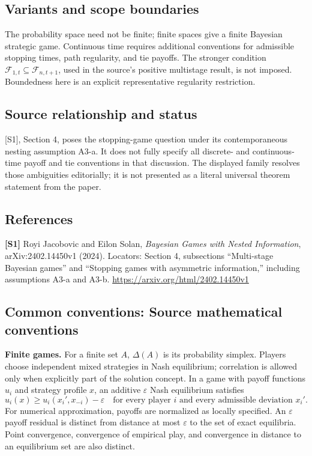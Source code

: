 \documentclass[11pt,a4paper]{article}
\begin{document}
\subsection*{Variants and scope boundaries}
The probability space need not be finite; finite spaces give a finite Bayesian strategic game. Continuous time requires additional conventions for admissible stopping times, path regularity, and tie payoffs. The stronger condition $\mathcal F_{1,t}\subseteq\mathcal F_{n,t+1}$, used in the source's positive multistage result, is not imposed. Boundedness here is an explicit representative regularity restriction.
\subsection*{Source relationship and status}
[S1], Section 4, poses the stopping-game question under its contemporaneous nesting assumption A3-a. It does not fully specify all discrete- and continuous-time payoff and tie conventions in that discussion. The displayed family resolves those ambiguities editorially; it is not presented as a literal universal theorem statement from the paper.
\subsection*{References}
\begingroup\footnotesize\raggedright
\textbf{[S1]} Royi Jacobovic and Eilon Solan, \emph{Bayesian Games with Nested Information}, arXiv:2402.14450v1 (2024). Locators: Section 4, subsections ``Multi-stage Bayesian games'' and ``Stopping games with asymmetric information,'' including assumptions A3-a and A3-b. \url{https://arxiv.org/html/2402.14450v1}
\par\endgroup

\subsection*{Common conventions: Source mathematical conventions}

\textbf{Finite games.} For a finite set $A$, $\Delta(A)$ is its probability
simplex. Players choose independent mixed strategies in Nash equilibrium;
correlation is allowed only when explicitly part of the solution concept.
In a game with payoff functions $u_i$ and strategy profile $x$, an additive
$\varepsilon$ Nash equilibrium satisfies
\[
 u_i(x)\geq u_i(x_i',x_{-i})-\varepsilon
 \quad\text{for every player $i$ and every admissible deviation $x_i'$}.
\]
For numerical approximation, payoffs are normalized as locally specified.
An $\varepsilon$ payoff residual is distinct from distance at most
$\varepsilon$ to the set of exact equilibria. Point convergence, convergence
of empirical play, and convergence in distance to an equilibrium set are
also distinct.
\end{document}
